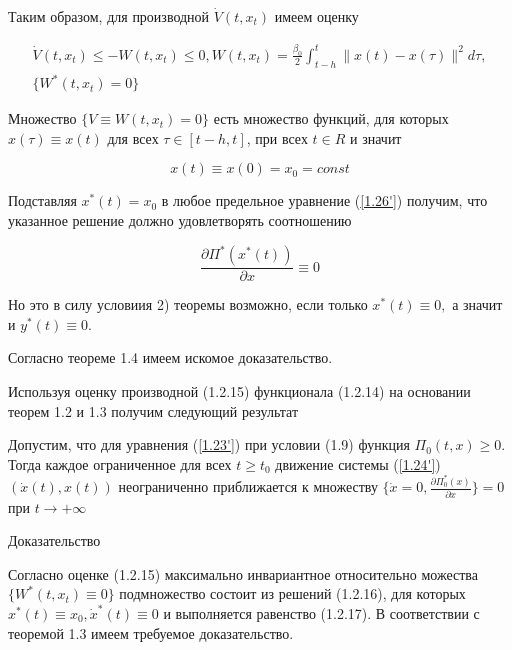Таким образом, для производной $\dot V(t, x_t)$ имеем оценку

\begin{equation} \label{1.27'}
	\begin{array}{c}
	\dot V(t, x_t) \le - W(t, x_t) \le 0, W(t, x_t) = \frac{\beta_0}{2} \int_{t - h}^{t} \| x(t) - x(\tau) \| ^ 2 d \tau,\\
	\lbrace W^{*} (t, x_t) = 0 \rbrace
	\end{array}
\end{equation}

Множество $ \lbrace V \equiv {W(t, x_t) = 0} \rbrace$ есть множество функций, для которых $x(\tau) \equiv x(t)$ для всех $\tau \in [t - h, t]$, при всех $t \in R$ и значит 

\begin{equation} \label{1.28'}
x(t) \equiv x(0) = x_0 = const
\end{equation}

Подставляя $x^{*}(t) = x_0$ в любое предельное уравнение (\ref{1.26'}) получим, что указанное решение должно удовлетворять соотношению 

\begin{equation} \label{1.29'}
\frac{\partial \Pi^{*} (x^{*} (t))}{\partial x} \equiv 0
\end{equation}

Но это в силу условиия 2) теоремы возможно, если только $x^{*} (t) \equiv 0,$ а значит и $y^{*}(t) \equiv 0.$

Согласно теореме 1.4 имеем искомое доказательство.

Используя оценку производной (1.2.15) функционала (1.2.14) на основании теорем 1.2 и 1.3 получим следующий результат

\begin{theorem}\label{t-1.7}
Допустим, что для уравнения (\ref{1.23'}) при условии (1.9) функция $\Pi_0 (t, x) \ge 0$. Тогда каждое ограниченное для всех $t \ge t_0$ движение системы (\ref{1.24'}) $(\dot x(t), x(t))$ неограниченно приближается к множеству $ \lbrace \dot x = 0, \frac{\partial \Pi_0^{*} (x)}{\partial x} \rbrace = 0$ при $t \to + \infty$
\end{theorem}

Доказательство

Согласно оценке (1.2.15) максимально инвариантное относительно можества $\lbrace W^{*}(t, x_t) \equiv 0 \rbrace$ подмножество состоит из решений (1.2.16), для которых $x^{*} (t) \equiv x_0, \dot x^{*}(t) \equiv 0$ и выполняется равенство (1.2.17). В соответствии с теоремой 1.3 имеем требуемое доказательство.

